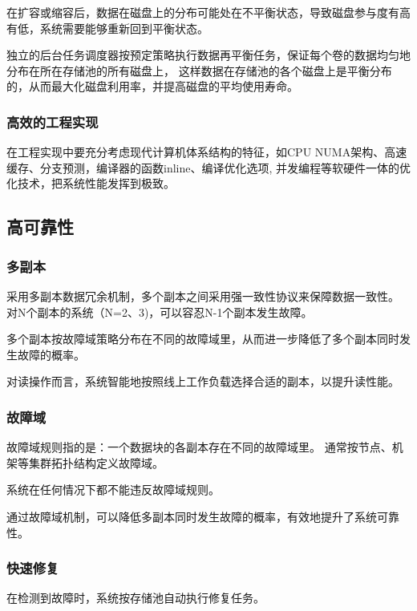 在扩容或缩容后，数据在磁盘上的分布可能处在不平衡状态，导致磁盘参与度有高有低，系统需要能够重新回到平衡状态。

独立的后台任务调度器按预定策略执行数据再平衡任务，保证每个卷的数据均匀地分布在所在存储池的所有磁盘上，
这样数据在存储池的各个磁盘上是平衡分布的，从而最大化磁盘利用率，并提高磁盘的平均使用寿命。

\subsubsection{高效的工程实现}


在工程实现中要充分考虑现代计算机体系结构的特征，如CPU NUMA架构、高速缓存、分支预测，编译器的函数inline、编译优化选项,
并发编程等软硬件一体的优化技术，把系统性能发挥到极致。

\subsection{高可靠性}

\subsubsection{多副本}

采用多副本数据冗余机制，多个副本之间采用强一致性协议来保障数据一致性。
对N个副本的系统（N=2、3)，可以容忍N-1个副本发生故障。

多个副本按故障域策略分布在不同的故障域里，从而进一步降低了多个副本同时发生故障的概率。

对读操作而言，系统智能地按照线上工作负载选择合适的副本，以提升读性能。

\subsubsection{故障域}

故障域规则指的是：一个数据块的各副本存在不同的故障域里。
通常按节点、机架等集群拓扑结构定义故障域。

系统在任何情况下都不能违反故障域规则。

通过故障域机制，可以降低多副本同时发生故障的概率，有效地提升了系统可靠性。

\subsubsection{快速修复}

在检测到故障时，系统按存储池自动执行修复任务。

